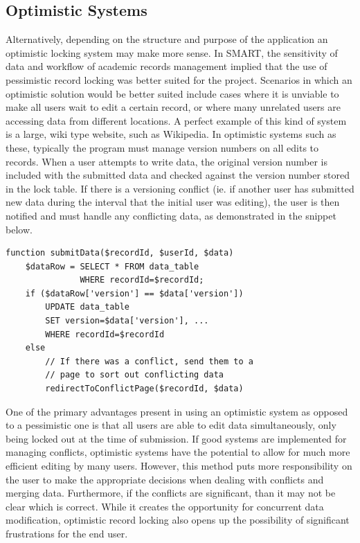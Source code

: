 \documentclass[12pt]{article}
\begin{document}
\subsection{Optimistic Systems}
Alternatively, depending on the structure and purpose of the application an optimistic locking system may make more sense. In SMART, the sensitivity of data and workflow of academic records management implied that the use of pessimistic record locking was better suited for the project. Scenarios in which an optimistic solution would be better suited include cases where it is unviable to make all users wait to edit a certain record, or where many unrelated users are accessing data from different locations. A perfect example of this kind of system is a large, wiki type website, such as Wikipedia. In optimistic systems such as these, typically the program must manage version numbers on all edits to records. When a user attempts to write data, the original version number is included with the submitted data and checked against the version number stored in the lock table. If there is a versioning conflict (ie. if another user has submitted new data during the interval that the initial user was editing), the user is then notified and must handle any conflicting data, as demonstrated in the snippet below.

\begin{framed}
\begin{spacing}{1.0}
\begin{verbatim}
function submitData($recordId, $userId, $data)
    $dataRow = SELECT * FROM data_table 
               WHERE recordId=$recordId;
    if ($dataRow['version'] == $data['version'])
        UPDATE data_table
        SET version=$data['version'], ...
        WHERE recordId=$recordId
    else
        // If there was a conflict, send them to a
        // page to sort out conflicting data
        redirectToConflictPage($recordId, $data)

\end{verbatim}
\end{spacing}
\end{framed}

One of the primary advantages present in using an optimistic system as opposed to a pessimistic one is that all users are able to edit data simultaneously, only being locked out at the time of submission. If good systems are implemented for managing conflicts, optimistic systems have the potential to allow for much more efficient editing by many users. However, this method puts more responsibility on the user to make the appropriate decisions when dealing with conflicts and merging data. Furthermore, if the conflicts are significant, than it may not be clear which is correct. While it creates the opportunity for concurrent data modification, optimistic record locking also opens up the possibility of significant frustrations for the end user.
\end{document}
